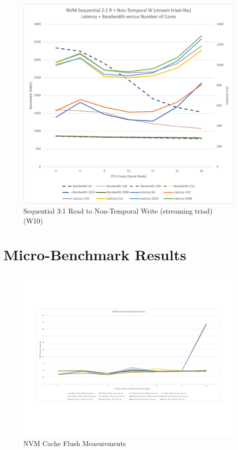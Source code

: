 \begin{figure}
    \centering
    \caption{Sequential 3:1 Read to Non-Temporal Write (streaming triad) (W10)}\label{chart:sequential:W10}
    \includegraphics[scale=0.5]{charts/sequential-w10-crop.pdf}
\end{figure}

\section{Micro-Benchmark Results}\label{section:results:micro}

\begin{figure}
    \centering
    \caption{NVM Cache Flush Measurements}\label{micro:cache-flush}
    \includegraphics[scale=0.35]{micro/nvm-cache-flush-measurements.pdf}
\end{figure}

